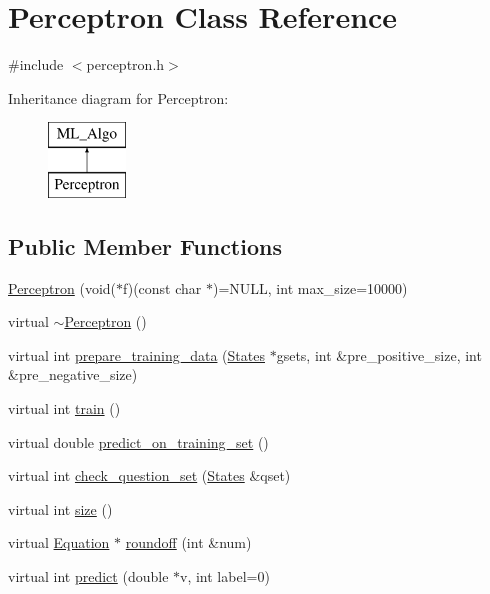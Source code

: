 \hypertarget{classPerceptron}{}\section{Perceptron Class Reference}
\label{classPerceptron}


{\ttfamily \#include $<$perceptron.\+h$>$}

Inheritance diagram for Perceptron\+:\begin{figure}[H]
\begin{center}
\leavevmode
\includegraphics[height=2.000000cm]{classPerceptron}
\end{center}
\end{figure}
\subsection*{Public Member Functions}
\begin{DoxyCompactItemize}
\item 
\hyperlink{classPerceptron_a74b79b672c7d5ac9d69c2f3f66ec09fa}{Perceptron} (void($\ast$f)(const char $\ast$)=N\+U\+LL, int max\+\_\+size=10000)
\item 
virtual \hyperlink{classPerceptron_a0267e40e981df9907129d858911840e7}{$\sim$\+Perceptron} ()
\item 
virtual int \hyperlink{classPerceptron_a2267c5acf9b4a7bd0f47522a530d3863}{prepare\+\_\+training\+\_\+data} (\hyperlink{classStates}{States} $\ast$gsets, int \&pre\+\_\+positive\+\_\+size, int \&pre\+\_\+negative\+\_\+size)
\item 
virtual int \hyperlink{classPerceptron_adc779991ee63dca333c12fb247b32c9d}{train} ()
\item 
virtual double \hyperlink{classPerceptron_ac9214d2cda4eeb9a06f6562bcb5df8ca}{predict\+\_\+on\+\_\+training\+\_\+set} ()
\item 
virtual int \hyperlink{classPerceptron_ac7ed76c6a28180691f63f2afbf93cc26}{check\+\_\+question\+\_\+set} (\hyperlink{classStates}{States} \&qset)
\item 
virtual int \hyperlink{classPerceptron_a50b1f76eb2760b540477135100dcbf49}{size} ()
\item 
virtual \hyperlink{classEquation}{Equation} $\ast$ \hyperlink{classPerceptron_a5408f0ea545d06bbef6630071c73fea2}{roundoff} (int \&num)
\item 
virtual int \hyperlink{classPerceptron_a414600a1f189c4f44c858b87048ae655}{predict} (double $\ast$v, int label=0)
\end{DoxyCompactItemize}

